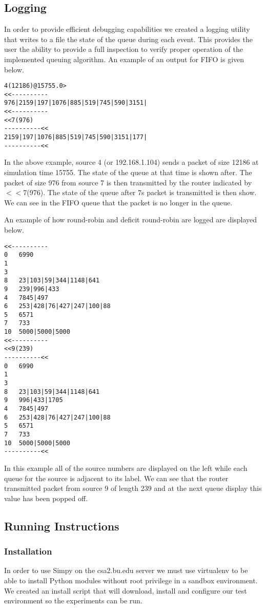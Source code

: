 \subsection{Logging}

In order to provide efficient debugging capabilities we created a logging utility that writes to a file the state of the queue during each event. This provides the user the ability to provide a full inspection to verify proper operation of the implemented queuing algorithm. An example of an output for FIFO is given below.

\begin{verbatim}
4(12186)@15755.0>
<<----------
976|2159|197|1076|885|519|745|590|3151|
<<----------
<<7(976)
----------<<
2159|197|1076|885|519|745|590|3151|177|
----------<<
\end{verbatim}

In the above example, source 4 (or 192.168.1.104) sends a packet of size 12186 at simulation time 15755. The state of the queue at that time is shown after. The packet of size 976 from source 7 is then transmitted by the router indicated by $<<$7(976). The state of the queue after 7s packet is transmitted is then show. We can see in the FIFO queue that the packet is no longer in the queue.

An example of how round-robin and deficit round-robin are logged are displayed below.

\begin{verbatim}
<<----------
0	6990
1	
3	
8	23|103|59|344|1148|641
9	239|996|433
4	7845|497
6	253|428|76|427|247|100|88
5	6571
7	733
10	5000|5000|5000
<<----------
<<9(239)
----------<<
0	6990
1	
3	
8	23|103|59|344|1148|641
9	996|433|1705
4	7845|497
6	253|428|76|427|247|100|88
5	6571
7	733
10	5000|5000|5000
----------<<
\end{verbatim}

In this example all of the source numbers are displayed on the left while each queue for the source is adjacent to its label. We can see that the router transmitted packet from source 9 of length 239 and at the next queue display this value has been popped off.



\subsection{Running Instructions}

\subsubsection{Installation}
In order to use Simpy on the csa2.bu.edu server we must use virtualenv to be able to install Python modules without root privilege in a sandbox environment. We created an install script that will download, install and configure our test environment so the experiments can be run.

